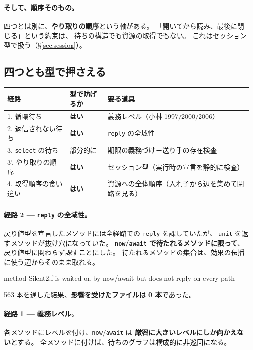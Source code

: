 \documentclass[11pt,a4paper]{ltjsarticle}
\theoremstyle{definition}
\theoremstyle{remark}
\begin{document}
\paragraph{そして、順序そのもの。}
四つとは別に、\textbf{やり取りの順序}という軸がある。
「開いてから読み、最後に閉じる」という約束は、
待ちの構造でも資源の取得でもない。
これはセッション型で扱う（\S\ref{sec:session}）。

\subsection{四つとも型で押さえる}

\begin{center}
\begin{tabular}{lll}
\toprule
経路 & 型で防げるか & 要る道具 \\
\midrule
1. 循環待ち & \textbf{はい} & 義務レベル（小林 1997/2000/2006） \\
2. 返信されない待ち & \textbf{はい} & \texttt{reply} の全域性 \\
3. \texttt{select} の待ち & 部分的に & 期限の義務づけ＋送り手の存在検査 \\
3'. やり取りの順序 & \textbf{はい} & セッション型（実行時の宣言を静的に検査） \\
4. 取得順序の食い違い & \textbf{はい} & 資源への全体順序（入れ子から辺を集めて閉路を見る） \\
\bottomrule
\end{tabular}
\end{center}

\paragraph{経路 2 --- \texttt{reply} の全域性。}
戻り値型を宣言したメソッドには全経路での \texttt{reply} を課していたが、
\texttt{unit} を返すメソッドが抜け穴になっていた。
\textbf{\texttt{now}/\texttt{await} で待たれるメソッドに限って}、
戻り値型に関わらず課すことにした。
待たれるメソッドの集合は、効果の伝播に使う辺からそのまま取れる。

\begin{term}
 method Silent2.f is waited on by now/await
             but does not reply on every path
\end{term}

563 本を通した結果、\textbf{影響を受けたファイルは 0 本}であった。

\paragraph{経路 1 --- 義務レベル。}
各メソッドにレベルを付け、\texttt{now}/\texttt{await} は
\textbf{厳密に大きいレベルにしか向かえない}とする。
全メソッドに付けば、待ちのグラフは構成的に非巡回になる。
\end{document}
